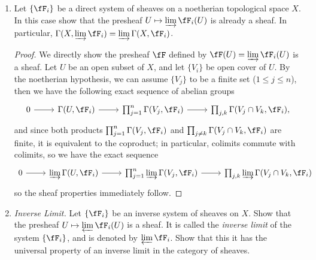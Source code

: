 \documentclass[a4paper]{article}
\begin{document}
\begin{enumerate} [label=\textbf{\arabic*.}, leftmargin=0em]
    \item[\textbf{11.}] Let $\{ \fF_i \}$ be a direct system of sheaves on a noetherian topological space $X$. In this case show that the presheaf $U \mapsto \varinjlim \fF_i(U)$ is already a sheaf. In particular, $\Gamma(X, \varinjlim \fF_i) = \varinjlim \Gamma(X, \fF_i)$.

          \begin{proof}
              We directly show the presheaf $\fF$ defined by $\fF(U) = \varinjlim \fF_i(U)$ is a sheaf. Let $U$ be an open subset of $X$, and let $\{ V_i \}$ be open cover of $U$. By the noetherian hypothesis, we can assume $\{ V_j \}$ to be a finite set ($1 \leq j \leq n$), then we have the following exact sequence of abelian groups
              \[ \begin{tikzcd}
                      0 \arrow[r] & {\Gamma(U, \fF_i)} \arrow[r] & {\prod_{j = 1}^n \Gamma(V_j, \fF_i)} \arrow[r] & {\prod_{j, k} \Gamma(V_j \cap V_k, \fF_i)},
                  \end{tikzcd} \]
              and since both products $\prod_{j = 1}^n \Gamma(V_j, \fF_i)$ and $\prod_{j \neq k} \Gamma(V_j \cap V_k, \fF_i)$ are finite, it is equivalent to the coproduct; in particular, colimits commute with colimits, so we have the exact sequence
              \[ \begin{tikzcd}
                      0 \arrow[r] & {\varinjlim \Gamma(U, \fF_i)} \arrow[r] & {\prod_{j = 1}^n \varinjlim \Gamma(V_j, \fF_i)} \arrow[r] & {\prod_{j, k} \varinjlim \Gamma(V_j \cap V_k, \fF_i)}
                  \end{tikzcd} \]
              so the sheaf properties immediately follow.
          \end{proof}

    \item[\textbf{12.}] \textit{Inverse Limit.} Let $\{ \fF_i \}$ be an inverse system of sheaves on $X$. Show that the presheaf $U \mapsto \varprojlim \fF_i(U)$ is a sheaf. It is called the \textit{inverse limit} of the system $\{ \fF_i \}$, and is denoted by $\varprojlim \fF_i$. Show that this it has the universal property of an inverse limit in the category of sheaves.


\end{enumerate}
\end{document}
